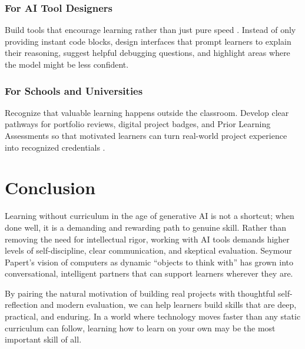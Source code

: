 \documentclass[11pt]{article}
\begin{document}
\subsubsection{For AI Tool Designers}
Build tools that encourage learning rather than just pure speed \citep{ravi2025}. Instead of only providing instant code blocks, design interfaces that prompt learners to explain their reasoning, suggest helpful debugging questions, and highlight areas where the model might be less confident.

\subsubsection{For Schools and Universities}
Recognize that valuable learning happens outside the classroom. Develop clear pathways for portfolio reviews, digital project badges, and Prior Learning Assessments so that motivated learners can turn real-world project experience into recognized credentials \citep{gallagher2022,lam2021}.

\section{Conclusion}

Learning without curriculum in the age of generative AI is not a shortcut; when done well, it is a demanding and rewarding path to genuine skill. Rather than removing the need for intellectual rigor, working with AI tools demands higher levels of self-discipline, clear communication, and skeptical evaluation. Seymour Papert’s vision of computers as dynamic ``objects to think with'' has grown into conversational, intelligent partners that can support learners wherever they are.

By pairing the natural motivation of building real projects with thoughtful self-reflection and modern evaluation, we can help learners build skills that are deep, practical, and enduring. In a world where technology moves faster than any static curriculum can follow, learning how to learn on your own may be the most important skill of all.



\end{document}

